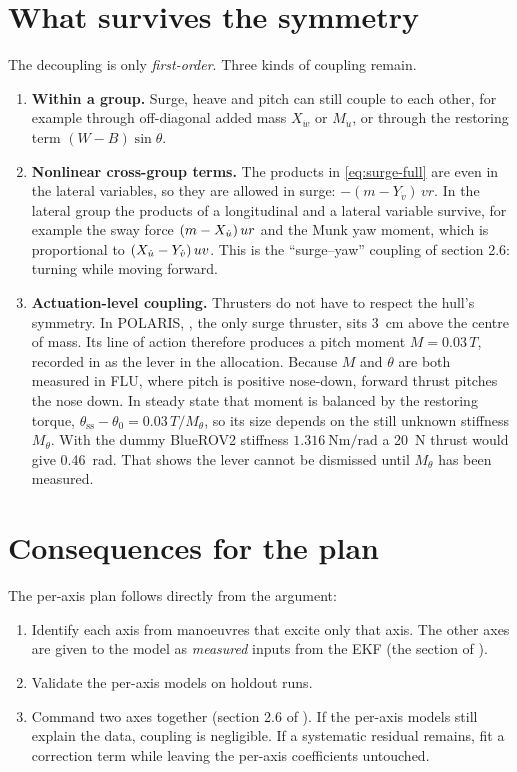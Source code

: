 \section{What survives the symmetry}

The decoupling is only \emph{first-order}. Three kinds of coupling remain.
\begin{enumerate}
  \item \textbf{Within a group.} Surge, heave and pitch can still couple to each other, for
        example through off-diagonal added mass $X_{\dot w}$ or $M_{\dot u}$, or through the
        restoring term $(W-B)\sin\theta$.
  \item \textbf{Nonlinear cross-group terms.} The products in \eqref{eq:surge-full} are even in
        the lateral variables, so they are allowed in surge: $-(m-Y_{\dot v})\,vr$. In the
        lateral group the products of a longitudinal and a lateral variable survive, for example the
        sway force $(m-X_{\dot u})\,ur$ and the Munk yaw moment, which is proportional to $(X_{\dot u} - Y_{\dot v})\,uv$. This is the
        ``surge--yaw'' coupling of  section 2.6: turning while moving
        forward.
  \item \textbf{Actuation-level coupling.} Thrusters do not have to respect the hull's symmetry.
        In POLARIS, , the only surge thruster, sits \qty{3}{\centi\meter} above the
        centre of mass. Its line of action therefore produces a pitch moment
        $M = 0.03\,T$, recorded in  as the lever  in the
         allocation. Because $M$ and $\theta$ are both measured in FLU, where pitch
        is positive nose-down, forward thrust pitches the nose down. In steady state that
        moment is balanced by the restoring torque,
        $\theta_\mathrm{ss} - \theta_0 = 0.03\,T/M_\theta$, so its size depends on the
        still unknown stiffness $M_\theta$. With the dummy BlueROV2 stiffness
        $\qty{1.316}{\newton\meter\per\radian}$ a \qty{20}{\newton} thrust would give
        \qty{0.46}{\radian}. That shows the lever cannot be dismissed until $M_\theta$ has been measured.
\end{enumerate}

\section{Consequences for the plan}

The per-axis plan follows directly from the argument:
\begin{enumerate}
  \item Identify each axis from manoeuvres that excite only that axis. The other axes are
        given to the model as \emph{measured} inputs from the EKF (the  section of
        ).
  \item Validate the per-axis models on holdout runs.
  \item Command two axes together (section 2.6 of ). If the per-axis models still
        explain the data, coupling is negligible. If a systematic residual remains, fit a
        correction term while leaving the per-axis coefficients untouched.
\end{enumerate}

